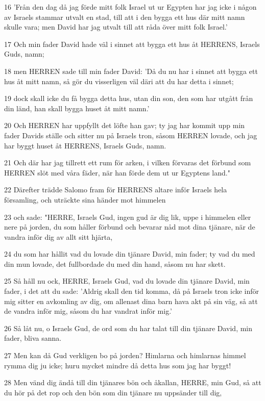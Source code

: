 \par 16 'Från den dag då jag förde mitt folk Israel ut ur Egypten har jag icke i någon av Israels stammar utvalt en stad, till att i den bygga ett hus där mitt namn skulle vara; men David har jag utvalt till att råda över mitt folk Israel.'
\par 17 Och min fader David hade väl i sinnet att bygga ett hus åt HERRENS, Israels Guds, namn;
\par 18 men HERREN sade till min fader David: 'Då du nu har i sinnet att bygga ett hus åt mitt namn, så gör du visserligen väl däri att du har detta i sinnet;
\par 19 dock skall icke du få bygga detta hus, utan din son, den som har utgått från din länd, han skall bygga huset åt mitt namn.'
\par 20 Och HERREN har uppfyllt det löfte han gav; ty jag har kommit upp min fader Davids ställe och sitter nu på Israels tron, såsom HERREN lovade, och jag har byggt huset åt HERRENS, Israels Guds, namn.
\par 21 Och där har jag tillrett ett rum för arken, i vilken förvaras det förbund som HERREN slöt med våra fäder, när han förde dem ut ur Egyptens land."
\par 22 Därefter trädde Salomo fram för HERRENS altare inför Israels hela församling, och uträckte sina händer mot himmelen
\par 23 och sade: "HERRE, Israels Gud, ingen gud är dig lik, uppe i himmelen eller nere på jorden, du som håller förbund och bevarar nåd mot dina tjänare, när de vandra inför dig av allt sitt hjärta,
\par 24 du som har hållit vad du lovade din tjänare David, min fader; ty vad du med din mun lovade, det fullbordade du med din hand, såsom nu har skett.
\par 25 Så håll nu ock, HERRE, Israels Gud, vad du lovade din tjänare David, min fader, i det att du sade: 'Aldrig skall den tid komma, då på Israels tron icke inför mig sitter en avkomling av dig, om allenast dina barn hava akt på sin väg, så att de vandra inför mig, såsom du har vandrat inför mig.'
\par 26 Så låt nu, o Israels Gud, de ord som du har talat till din tjänare David, min fader, bliva sanna.
\par 27 Men kan då Gud verkligen bo på jorden? Himlarna och himlarnas himmel rymma dig ju icke; huru mycket mindre då detta hus som jag har byggt!
\par 28 Men vänd dig ändå till din tjänares bön och åkallan, HERRE, min Gud, så att du hör på det rop och den bön som din tjänare nu uppsänder till dig,
